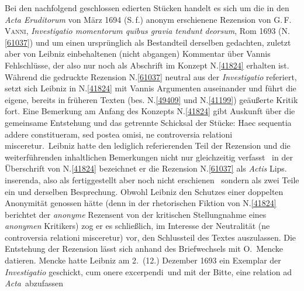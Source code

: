 \vspace{5mm}
\begin{ledgroup}
\footnotesize
\pstart
\noindent
Bei den nachfolgend geschlossen edierten Stücken handelt es sich um
die in den \cite{01023}\textit{Acta Eruditorum} von März 1694 (S.\,f.) 
anonym erschienene Rezension von 
\textsc{G.\,F. Vanni}, \cite{02001}\textit{Investigatio momentorum quibus gravia tendunt deorsum}, Rom 1693 (N.\;\ref{61037})
und um einen ursprünglich als Bestandteil derselben gedachten, zuletzt aber von Leibniz einbehaltenen (\glqq nicht abgangen\grqq)
Kommentar über Vannis Fehlschlüsse, der also nur noch als Abschrift im Konzept N.\;\ref{41824} erhalten ist.
\pend
\pstart
Während die gedruckte Rezension N.\;\ref{61037} neutral aus der \cite{02001}\textit{Investigatio} referiert,
setzt sich Leibniz in N.\;\ref{41824} mit Vannis Argumenten
auseinander und führt die eigene, bereits in früheren Texten (bes. N.\;\ref{49409} und N.\;\ref{41199}) geäußerte Kritik fort.
Eine Bemerkung am Anfang des Konzepts N.\;\ref{41824} gibt Auskunft über die gemeinsame Entstehung und das getrennte Schicksal der Stücke:
\glqq Haec sequentia addere constitueram, sed postea omisi, ne controversia relationi misceretur.\grqq\ 
Leibniz hatte den lediglich referierenden Teil der Rezension und die weiterführenden inhaltlichen Bemerkungen nicht nur gleichzeitig verfasst
\textendash\
in der Überschrift von N.\;\ref{41824} bezeichnet er die Rezension N.\;\ref{61037} als \glqq\textit{Actis} Lips. inserenda\grqq, also als fertiggestellt aber noch nicht erschienen \textendash\
sondern als zwei Teile ein und derselben Besprechung.
Obwohl Leibniz den Schutzes einer doppelten Anonymität genossen hätte
(denn in der rhetorischen Fiktion von N.\;\ref{41824} berichtet der \textit{anonyme} Rezensent von der kritischen Stellungnahme eines \textit{anonymen} Kritikers)
zog er es schließlich, im Interesse der Neutralität (\glqq ne controversia relationi misceretur\grqq) vor,
den Schlussteil des Textes auszulassen.
\pend
\pstart
Die Entstehung der Rezension lässt sich anhand des Briefwechsels mit 
O.~Mencke
datieren.
Mencke hatte Leibniz am 2.~(12.) Dezember 1693 ein Exemplar der \cite{02001}\textit{Investigatio} geschickt,
\glqq cum onere excerpendi\grqq\ und mit der Bitte, eine \glqq relation ad \textit{Acta}\grqq\ abzufassen 

\end{ledgroup}
